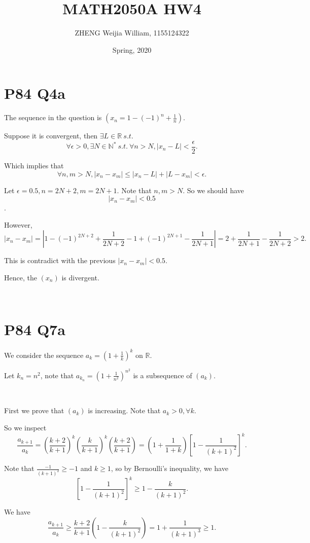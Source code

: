 \documentclass[12pt]{article}%
\begin{document}
\title{MATH2050A HW4}
\author{ZHENG Weijia William, 1155124322}
\date{Spring, 2020}
\maketitle

\section{P84 Q4a}

The sequence in the question is $(x_n=1-(-1)^{n}+\frac{1}{n}).$

Suppose it is convergent, then $\exists L \in \mathbb{R}~s.t.$ $$\forall \epsilon>0, \exists N\in \mathbb{N^*}~s.t.~\forall n>N, |x_n-L|<\frac{\epsilon}{2}.$$

Which implies that $$\forall n,m>N, |x_n-x_m|\leq |x_n-L|+|L-x_m|< \epsilon.$$

Let $\epsilon=0.5,n=2N+2,m=2N+1.$ Note that $n,m>N.$ So we should have $$|x_n-x_m|<0.5$$. 

However, $$|x_n-x_m|=|1-(-1)^{2N+2}+\frac{1}{2N+2}-1+(-1)^{2N+1}-\frac{1}{2N+1}|=2+\frac{1}{2N+1}-\frac{1}{2N+2}>2.$$ 

This is contradict with the previous $|x_n-x_m|<0.5.$

Hence, the $(x_n)$ is divergent.


~\

\section{P84 Q7a}

We consider the sequence $a_k=(1+\frac{1}{k})^k$ on $\mathbb{R}.$ 

Let $k_n=n^2$, note that $a_{k_n}=(1+\frac{1}{n^2})^{n^2}$ is a subsequence of $(a_k)$.

~\

First we prove that $(a_k)$ is increasing. Note that $a_k>0, \forall k.$

So we inspect $$\frac{a_{k+1}}{a_k}=(\frac{k+2}{k+1})^k (\frac{k}{k+1})^k (\frac{k+2}{k+1})=(1+\frac{1}{1+k})[1-\frac{1}{(k+1)^2}]^k.$$

Note that $\frac{-1}{(k+1)^2}\geq -1$ and $k\geq 1$, so by Bernoulli's inequality, we have $$[1-\frac{1}{(k+1)^2}]^k\geq 1-\frac{k}{(k+1)^2}.$$

We have $$\frac{a_{k+1}}{a_k}\geq \frac{k+2}{k+1}(1-\frac{k}{(k+1)^2})=1+\frac{1}{(k+1)^3}\geq 1.$$

~\
\end{document}
